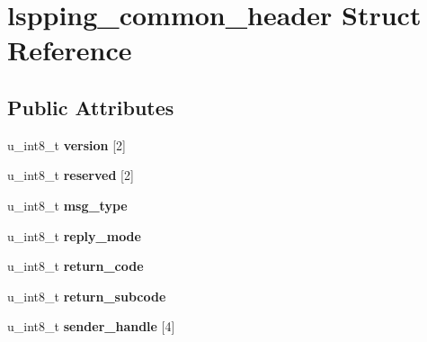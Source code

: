 \hypertarget{structlspping__common__header}{
\section{lspping\_\-common\_\-header Struct Reference}
\label{structlspping__common__header}
}
\subsection*{Public Attributes}
\begin{DoxyCompactItemize}
\item 
\hypertarget{structlspping__common__header_a168ccd7d1ace34f8b13a357c8a5b91be}{
u\_\-int8\_\-t {\bfseries version} \mbox{[}2\mbox{]}}
\label{structlspping__common__header_a168ccd7d1ace34f8b13a357c8a5b91be}

\item 
\hypertarget{structlspping__common__header_abe477ac0e8c1bf11d9dc9b4e48e5f7fc}{
u\_\-int8\_\-t {\bfseries reserved} \mbox{[}2\mbox{]}}
\label{structlspping__common__header_abe477ac0e8c1bf11d9dc9b4e48e5f7fc}

\item 
\hypertarget{structlspping__common__header_a21ee93e3bc197c7f6959a2522cc82fe4}{
u\_\-int8\_\-t {\bfseries msg\_\-type}}
\label{structlspping__common__header_a21ee93e3bc197c7f6959a2522cc82fe4}

\item 
\hypertarget{structlspping__common__header_a19513f4592cec1d3e1199372a8348a25}{
u\_\-int8\_\-t {\bfseries reply\_\-mode}}
\label{structlspping__common__header_a19513f4592cec1d3e1199372a8348a25}

\item 
\hypertarget{structlspping__common__header_af042a79c13d305dfb169ff78e6324a06}{
u\_\-int8\_\-t {\bfseries return\_\-code}}
\label{structlspping__common__header_af042a79c13d305dfb169ff78e6324a06}

\item 
\hypertarget{structlspping__common__header_a2b46c43fd4841f59c9c5b753304b0d95}{
u\_\-int8\_\-t {\bfseries return\_\-subcode}}
\label{structlspping__common__header_a2b46c43fd4841f59c9c5b753304b0d95}

\item 
\hypertarget{structlspping__common__header_acbb907da341267ed08c841f289799828}{
u\_\-int8\_\-t {\bfseries sender\_\-handle} \mbox{[}4\mbox{]}}
\label{structlspping__common__header_acbb907da341267ed08c841f289799828}


\end{DoxyCompactItemize}
